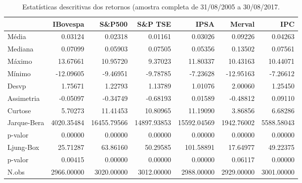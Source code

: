 \begin{table}[ht]
\centering
\caption{Estatísticas descritivas dos retornos 
               (amostra completa de 31/08/2005 a 30/08/2017.} 
\label{tab:descritivas}
\begin{tabular}{lrrrrrr}
  \hline
 & IBovespa & S\&P500 & S\&P TSE & IPSA & Merval & IPC \\ 
  \hline
Média & 0.03124 & 0.02318 & 0.01161 & 0.03026 & 0.09226 & 0.04263 \\ 
  Mediana & 0.07099 & 0.05903 & 0.07505 & 0.05356 & 0.13502 & 0.07561 \\ 
  Máximo & 13.67661 & 10.95720 & 9.37023 & 11.80337 & 10.43163 & 10.44071 \\ 
  Mínimo & -12.09605 & -9.46951 & -9.78785 & -7.23628 & -12.95163 & -7.26612 \\ 
  Desvp & 1.75671 & 1.22793 & 1.13789 & 1.01076 & 2.00060 & 1.25450 \\ 
  Assimetria & -0.05097 & -0.34749 & -0.68193 & 0.01589 & -0.48812 & 0.09110 \\ 
  Curtose & 5.70273 & 11.41453 & 10.80965 & 11.19090 & 3.86856 & 6.68286 \\ 
  Jarque-Bera & 4020.35484 & 16455.79566 & 14897.93853 & 15592.04569 & 1942.76002 & 5588.58043 \\ 
  p-valor & 0.00000 & 0.00000 & 0.00000 & 0.00000 & 0.00000 & 0.00000 \\ 
  Ljung-Box & 25.71287 & 63.86160 & 50.29585 & 101.58891 & 17.64977 & 49.22375 \\ 
  p-valor & 0.00415 & 0.00000 & 0.00000 & 0.00000 & 0.06117 & 0.00000 \\ 
  N.obs & 2966.00000 & 3020.00000 & 3012.00000 & 2988.00000 & 2929.00000 & 3001.00000 \\ 
   \hline
\end{tabular}
\end{table}
